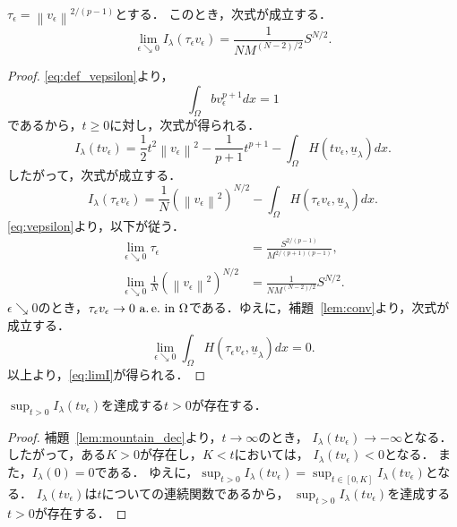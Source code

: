\begin{lem} \label{lem:tauepsilon}
 $\tau_\epsilon = \left\| v_\epsilon \right\|^{2/(p-1)}$とする．
 このとき，次式が成立する．
 \begin{equation}
  \lim_{\epsilon \searrow 0} I_\lambda (\tau_\epsilon v_\epsilon) = 
   \frac{1}{NM^{(N-2)/2}} S^{N/2}. \label{eq:limI}
 \end{equation}
\end{lem}

\begin{proof}
 \eqref{eq:def_vepsilon}より，
 \[
  \int_\Omega bv_\epsilon^{p+1} dx = 1
 \]
 であるから，$t \geq 0$に対し，次式が得られる．
 \[
  I_\lambda(tv_\epsilon) = \frac{1}{2} t^2 \left\| v_\epsilon
 \right\|^2 - \frac{1}{p+1} t^{p+1} - \int_\Omega H(tv_\epsilon,
 \underline{u}_\lambda) dx.
 \]
 したがって，次式が成立する．
 \[
  I_\lambda(\tau_\epsilon v_\epsilon) = \frac{1}{N} \left( \left\|
 v_\epsilon \right\|^2 \right)^{N/2} - \int_\Omega H(\tau_\epsilon
 v_\epsilon, \underline{u}_\lambda) dx.
 \]
 \eqref{eq:vepsilon}より，以下が従う．
 \begin{align*}
  \lim_{\epsilon \searrow 0} \tau_\epsilon
  &= \frac{S^{2/(p-1)}}{M^{2/(p+1)(p-1)}}, \\
  \lim_{\epsilon \searrow 0} \frac{1}{N} \left( \left\|
 v_\epsilon \right\|^2 \right)^{N/2} &= \frac{1}{NM^{(N-2)/2}}
  S^{N/2}.
 \end{align*}
 $\epsilon \searrow 0$のとき，$\tau_\epsilon v_\epsilon \to 0 ~\text{a.\,e.}~
 \text{in}~ \Omega$である．ゆえに，補題~\ref{lem:conv}より，次式が成立する．
 \[
  \lim_{\epsilon \searrow 0} \int_\Omega H(\tau_\epsilon
 v_\epsilon, \underline{u}_\lambda) dx = 0.
 \]
 以上より，\eqref{eq:limI}が得られる．\qedhere
\end{proof}

\begin{lem} \label{lem:t_epsilon}
$\sup_{t > 0} I_\lambda (tv_\epsilon)$を達成する$t > 0$が存在する．
\end{lem}

\begin{proof}
補題~\ref{lem:mountain_dec}より，$t \to \infty$のとき，
$I_\lambda(t v_\epsilon) \to -\infty$となる．
したがって，ある$K>0$が存在し，$K < t$においては，
$I_\lambda(t v_\epsilon) < 0$となる．
また，$I_\lambda(0) = 0$である．
ゆえに，$\sup_{t > 0} I_\lambda (tv_\epsilon) = 
\sup_{t \in [0, K]} I_\lambda (tv_\epsilon)$となる．
$I_\lambda(tv_\epsilon)$は$t$についての連続関数であるから，
$\sup_{t > 0} I_\lambda (tv_\epsilon)$を達成する$t > 0$が存在する．\qedhere
\end{proof}


